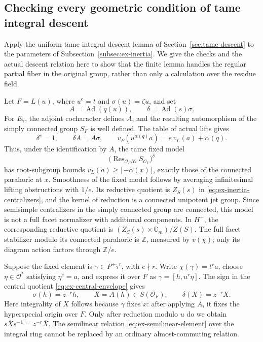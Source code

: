\documentclass[11pt,a4paper]{article}
\theoremstyle{definition}
\theoremstyle{remark}
\begin{document}
\subsection{Checking every geometric condition of tame integral descent}
\label{subsec:ex-integral-descent}

Apply the uniform tame integral descent lemma of
Section~\ref{sec:tame-descent} to the parameters of
Subsection~\ref{subsec:ex-inertia}.
We give the checks and the actual descent relation here to show that the
finite lemma handles the regular partial fiber in the original group,
rather than only a calculation over the residue field.

Let \(F=L(u)\), where \(u^e=t\) and \(\sigma(u)=\zeta u\), and set
\begin{equation}\label{eq:ex-descent-operators}
A=\operatorname{Ad}(q(u)),\qquad
\delta=\operatorname{Ad}(s)\sigma.
\end{equation}
For \(E_7\), the adjoint cocharacter defines \(A\), and the resulting
automorphism of the simply connected group \(S_F\) is well defined.
The table of actual lifts gives
\begin{equation}\label{eq:ex-descent-root-valuations}
\delta^e=1,\qquad \delta A=A\sigma,\qquad
v_F(u^{\alpha(q)}a)=e\,v_L(a)+\alpha(q).
\end{equation}
Thus, under the identification by \(A\), the tame fixed model
\[
\bigl(\operatorname{Res}_{\mathcal O_F/\mathcal O}
S_{\mathcal O_F}\bigr)^\delta
\]
has root-subgroup bounds
\(v_L(a)\ge\lceil-\alpha(x)\rceil\), exactly those of the connected
parahoric at \(x\).
Smoothness of the fixed model follows by averaging infinitesimal lifting
obstructions with \(1/e\).
Its reductive quotient is \(Z_S(s)\) in
\eqref{eq:ex-inertia-centralizers}, and the kernel of reduction is a
connected unipotent jet group.
Since semisimple centralizers in the simply connected group are connected,
this model is not a full facet normalizer with additional components.
In \(H^+\), the corresponding reductive quotient is
\((Z_S(s)\times\mathbb G_m)/Z(S)\).
The full facet stabilizer modulo its connected parahoric is
\(\mathbb Z\), measured by \(v(\chi)\); only its diagram action factors
through \(\mathbb Z/e\).

Suppose the fixed element is
\(\gamma\in P^+\dot\tau^r\), with \(e\nmid r\).
Write \(\chi(\gamma)=t^r a\), choose
\(\eta\in\mathcal O^*\) satisfying \(\eta^e=a\), and express it over \(F\)
as \(\gamma=[h,u^r\eta]\).
The sign in the central quotient
\eqref{eq:ex-central-envelope} gives
\begin{equation}\label{eq:ex-semilinear-element}
\sigma(h)=z^{-r}h,\qquad
X=A(h)\in S(\mathcal O_F),\qquad
\delta(X)=z^{-r}X.
\end{equation}
Here integrality of \(X\) follows because \(\gamma\) fixes \(x\): after
applying \(A\), it fixes the hyperspecial origin over \(F\).
Only after reduction modulo \(u\) do we obtain
\(s\overline Xs^{-1}=z^{-r}\overline X\).
The semilinear relation \eqref{eq:ex-semilinear-element} over the integral
ring cannot be replaced by an ordinary almost-commuting relation.
\end{document}
